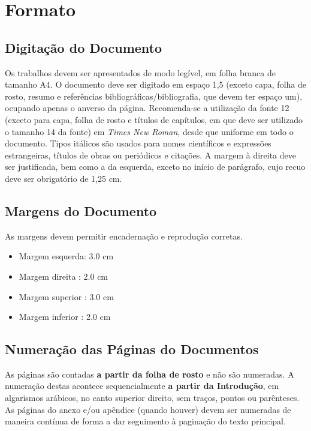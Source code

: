 \documentclass[
	12pt,				%
	openright,			%
	oneside,			%
	a4paper,			%
	english,			%
	french,				%
	spanish,			%
	brazil				%
	]{abntex2}
\begin{document}
\chapter{Formato} \label{ch:formato}

\section{Digitação do Documento}

\par Os trabalhos devem ser apresentados de modo legível, em folha branca de tamanho A4. O documento deve ser digitado em espaço 1,5 (exceto capa, folha de rosto, resumo e referências bibliográficas/bibliografia, que devem ter espaço um), ocupando apenas o anverso da página. Recomenda-se a utilização da fonte 12 (exceto para capa, folha de rosto e títulos de capítulos, em que deve ser utilizado o tamanho 14 da fonte) em \textit{Times New Roman}, desde que uniforme em todo o documento. Tipos itálicos são usados para nomes científicos e expressões estrangeiras, títulos de obras ou periódicos e citações. A margem à direita deve ser justificada, bem como a da esquerda, exceto no início de parágrafo, cujo recuo deve ser obrigatório de 1,25 cm.

\section{Margens do Documento}

\par As margens devem permitir encadernação e reprodução corretas.
\begin{itemize}
\item Margem esquerda: 3.0 cm
\item Margem direita : 2.0 cm
\item Margem superior : 3.0 cm
\item Margem inferior : 2.0 cm
\end{itemize}

\section{Numeração das Páginas do Documentos}
\par As páginas são contadas \textbf{a partir da folha de rosto} e não são numeradas. A numeração destas acontece sequencialmente \textbf{a partir da Introdução}, em algarismos arábicos, no canto superior direito, sem traços, pontos ou parênteses. As páginas do anexo e/ou apêndice (quando houver) devem ser numeradas de maneira contínua de forma a dar seguimento à paginação do texto principal.
\end{document}
